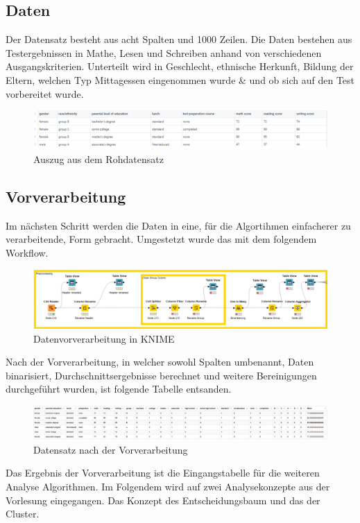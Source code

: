 \documentclass[12pt,					%
							 oneside,			%
							 a4paper,			%
							 halfparskip,		%
							 liststotoc,			%
							 bibtotoc,			%
							 fleqn,				%
							 pointlessnumbers]	%
							 {scrreprt}
\begin{document}
	\subsection{Daten}
	Der Datensatz besteht aus acht Spalten und 1000 Zeilen.  Die Daten bestehen aus Testergebnissen in Mathe, Lesen und Schreiben anhand von verschiedenen Ausgangskriterien. Unterteilt wird in Geschlecht, ethnische Herkunft, Bildung der Eltern, welchen Typ Mittagessen eingenommen wurde \& und ob sich auf den Test vorbereitet wurde. 
	\begin{figure}[!h]
		\includegraphics[scale=0.65]{pictures/roh.png}
		\caption{Auszug aus dem Rohdatensatz}
	\end{figure}
	\subsection{Vorverarbeitung}
	Im nächsten Schritt werden die Daten in eine, für die Algortihmen einfacherer zu verarbeitende, Form gebracht. Umgestetzt wurde das mit dem folgendem Workflow.
	\begin{figure}[!h]
		\includegraphics[scale=0.50]{pictures/preprocessing.png}
		\caption{Datenvorverarbeitung in KNIME}
	\end{figure}
	
	Nach der Vorverarbeitung, in welcher sowohl Spalten umbenannt, Daten binarisiert, Durchschnittsergebnisse berechnet und weitere Bereinigungen durchgeführt wurden, ist folgende Tabelle entsanden.
	
	\begin{figure}[!h]
		\includegraphics[scale=0.47]{pictures/processed.png}
		\caption{Datensatz nach der Vorverarbeitung }
	\end{figure}
	
	Das Ergebnis der Vorverarbeitung ist die Eingangstabelle für die weiteren Analyse Algorithmen. Im Folgendem wird auf zwei Analysekonzepte aus der Vorlesung eingegangen. Das Konzept des Entscheidungsbaum und das der Cluster.
\end{document}
